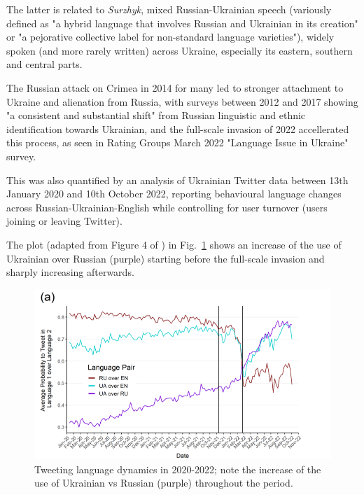 The latter is related to \emph{Surzhyk}, mixed Russian-Ukrainian speech
(variously defined as "a hybrid language that involves Russian and
Ukrainian in its creation"\cite{Sira2019} or "a pejorative collective
label for non-standard language
varieties"\cite{bernsand2001surzhyk}), widely spoken (and
more rarely written) across Ukraine, especially its eastern, southern
and central parts\cite{Sira2019}.

The Russian attack on Crimea in 2014 for many led to stronger attachment
to Ukraine and alienation from Russia, with surveys between 2012 and
2017 showing "a consistent and substantial shift"\cite{Racek2024} from
Russian linguistic and ethnic identification towards
Ukrainian\cite{kulyk2018shedding}, and the full-scale invasion of 2022
accellerated this process, as seen in Rating Group\textquotesingle s
March 2022 "Language Issue in Ukraine"
survey\cite{ratinggroupSixthNational}.

This was also quantified by an analysis \cite{Racek2024} of Ukrainian
Twitter data between 13th January 2020 and 10th October 2022, reporting
behavioural language changes across Russian-Ukrainian-English while
controlling for user turnover (users joining or leaving Twitter).

The plot (adapted from Figure 4 of \cite{Racek2024}) in Fig.~\ref{fig:twitter} shows an increase of the use of Ukrainian over Russian
(purple) starting before the full-scale invasion and sharply increasing
afterwards. 

\begin{figure}[t]
\centering
\includegraphics[width=1.0\linewidth]{Figures/ru_ua_twitter.png}
\decoRule
\caption[Ukrainian language dynamics on Twitter]{Tweeting language dynamics in 2020-2022; note the increase of the use of Ukrainian vs Russian (purple) throughout the period.}
\label{fig:twitter}
\end{figure}

